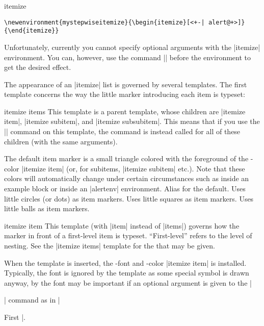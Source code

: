 \begin{environment}{{itemize}}
  \example
\begin{verbatim}
\newenvironment{mystepwiseitemize}{\begin{itemize}[<+-| alert@+>]}{\end{itemize}}
\end{verbatim}

  \lyxnote
  Unfortunately, currently you cannot specify optional arguments with
  the |itemize| environment. You can, however, use the command
  |\beamerdefaultoverlayspecification| before the environment to get
  the desired effect.

  The appearance of an |itemize| list is governed by several
  templates. The first template concerns the way the little marker
  introducing each item is typeset:
  \begin{element}{itemize items}\semiyes\no\no
    This template is a parent template, whose children are
    |itemize item|, |itemize subitem|, and |itemize subsubitem|. This
    means that if you use the |\setbeamertemplate| command on this
    template, the command is instead called for all of these children
    (with the same arguments).

    \begin{templateoptions}
      The default item marker is a small triangle colored with the
      foreground of the \beamer-color |itemize item| (or, for
      subitems, |itemize subitem| etc.). Note that these colors will
      automatically change under certain circumstances such as inside
      an example block or inside an |alertenv| environment.
      Alias for the default.
      Uses little circles (or dots) as item markers.
      Uses little squares as item markers.
      Uses little balls as item markers.
    \end{templateoptions}
  \end{element}

  \begin{element}{itemize item}\yes\yes\yes
    This template (with |item| instead of |items|) governs how the
    marker in front of a first-level item is typeset. ``First-level''
    refers to the level of nesting. See the |itemize items| template
    for the  that may be given.

    When the template is inserted, the \beamer-font and -color
    |itemize item| is installed. Typically, the font is ignored by the
    template as some special symbol is drawn anyway, by the font may
    be important if an optional argument is given to the
    |\item| command as in |\item[First]|.


\end{element}
\end{environment}

